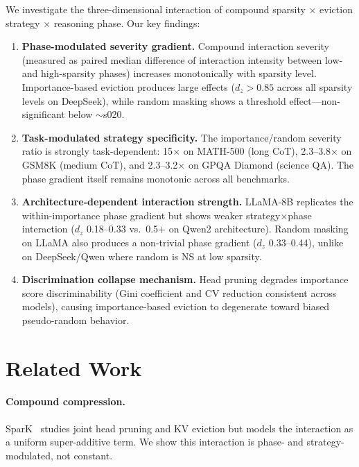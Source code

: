 \documentclass[11pt,a4paper]{article}
\begin{document}
We investigate the three-dimensional interaction of compound sparsity $\times$ eviction strategy $\times$ reasoning phase. Our key findings:

\begin{enumerate}
    \item \textbf{Phase-modulated severity gradient.} Compound interaction severity (measured as paired median difference of interaction intensity between low- and high-sparsity phases) increases monotonically with sparsity level. Importance-based eviction produces large effects ($d_z > 0.85$ across all sparsity levels on DeepSeek), while random masking shows a threshold effect---non-significant below $\sim$s020.

    \item \textbf{Task-modulated strategy specificity.} The importance/random severity ratio is strongly task-dependent: 15$\times$ on MATH-500 (long CoT), 2.3--3.8$\times$ on GSM8K (medium CoT), and 2.3--3.2$\times$ on GPQA Diamond (science QA). The phase gradient itself remains monotonic across all benchmarks.

    \item \textbf{Architecture-dependent interaction strength.} LLaMA-8B replicates the within-importance phase gradient but shows weaker strategy$\times$phase interaction ($d_z$ 0.18--0.33 vs.\ 0.5+ on Qwen2 architecture). Random masking on LLaMA also produces a non-trivial phase gradient ($d_z$ 0.33--0.44), unlike on DeepSeek/Qwen where random is NS at low sparsity.

    \item \textbf{Discrimination collapse mechanism.} Head pruning degrades importance score discriminability (Gini coefficient and CV reduction consistent across models), causing importance-based eviction to degenerate toward biased pseudo-random behavior.
\end{enumerate}

\section{Related Work}

\paragraph{Compound compression.} SparK~\cite{spark2025} studies joint head pruning and KV eviction but models the interaction as a uniform super-additive term. We show this interaction is phase- and strategy-modulated, not constant.
\end{document}
